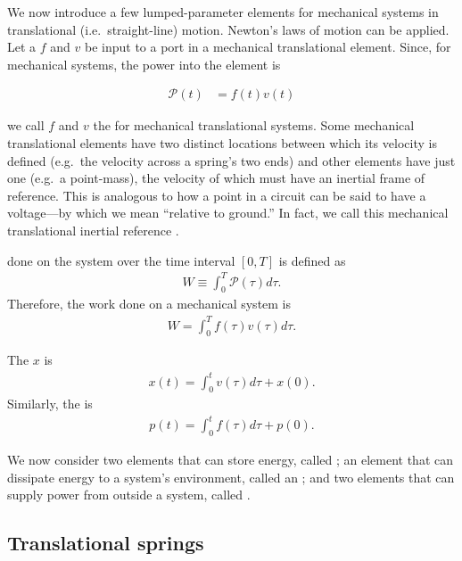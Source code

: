 \documentclass[dynamic_systems.tex]{subfiles}
\begin{document}
We now introduce a few lumped-parameter elements for mechanical systems in translational (i.e.\ straight-line) motion.
Newton's laws of motion can be applied.
Let a  $f$ and  $v$ be input to a port in a mechanical translational element.
Since, for mechanical systems, the power into the element is 

\begin{align}
	\mathcal{P}(t) &= f(t) v(t)
\end{align}

we call $f$ and $v$ the  for mechanical translational systems.
Some mechanical translational elements have two distinct locations between which its velocity is defined (e.g.\ the velocity across a spring's two ends) and other elements have just one (e.g.\ a point-mass), the velocity of which must have an inertial frame of reference.
This is analogous to how a point in a circuit can be said to have a voltage---by which we mean ``relative to ground.''
In fact, we call this mechanical translational inertial reference .

 done on the system over the time interval $[0,T]$ is defined as
\begin{align}
	W \equiv \int_0^T \mathcal{P}(\tau) d\tau.
\end{align}
Therefore, the work done on a mechanical system is 
\begin{align}
	W = \int_0^T f(\tau) v(\tau) d\tau.
\end{align}

The  $x$ is
\begin{align}
	x(t) = \int_0^t v(\tau) d\tau + x(0).
\end{align}
Similarly, the  is
\begin{align}
	p(t) = \int_0^t f(\tau) d\tau + p(0).
\end{align}

We now consider two elements that can store energy, called ; an element that can dissipate energy to a system's environment, called an ; and two elements that can supply power from outside a system, called .

\subsection{Translational springs}
\tags{}
\end{document}
